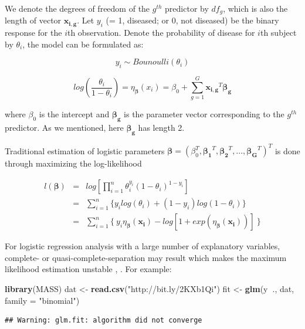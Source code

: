 \documentclass[12pt,]{krantz}
\makeatletter
\newenvironment{Shaded}{\begin{snugshade}}{\end{snugshade}}
\newcommand{\DataTypeTok}[1]{\textcolor[rgb]{0.27,0.27,0.27}{#1}}
\newcommand{\KeywordTok}[1]{\textcolor[rgb]{0.27,0.27,0.27}{\textbf{#1}}}
\newcommand{\NormalTok}[1]{#1}
\newcommand{\OperatorTok}[1]{\textcolor[rgb]{0.43,0.43,0.43}{\textbf{#1}}}
\newcommand{\StringTok}[1]{\textcolor[rgb]{0.5,0.5,0.5}{#1}}
\newenvironment{kframe}{%
\medskip{}
\setlength{\fboxsep}{.8em}
 \def\at@end@of@kframe{}%
 \ifinner\ifhmode%
  \def\at@end@of@kframe{\end{minipage}}%
  \begin{minipage}{\columnwidth}%
 \fi\fi%
 \def\FrameCommand##1{\hskip\@totalleftmargin \hskip-\fboxsep
 \colorbox{shadecolor}{##1}\hskip-\fboxsep
     \hskip-\linewidth \hskip-\@totalleftmargin \hskip\columnwidth}%
 \MakeFramed {\advance\hsize-\width
   \@totalleftmargin\z@ \linewidth\hsize
   \@setminipage}}%
 {\par\unskip\endMakeFramed%
 \at@end@of@kframe}
\renewenvironment{Shaded}{\begin{kframe}}{\end{kframe}}
\makeatother
\begin{document}
We denote the degrees of freedom of the \(g^{th}\) predictor by \(df_g\), which is also the length of vector \(\mathbf{x_{i,g}}\). Let \(y_i\) (= 1, diseased; or 0, not diseased) be the binary response for the \(i\)th observation. Denote the probability
of disease for \(i\)th subject by \(\theta_i\), the model can be formulated as:

\[y_{i}\sim Bounoulli(\theta_{i})\]

\[log\left(\frac{\theta_{i}}{1-\theta_{i}}\right)=\eta_{\mathbf{\beta}}(x_{i})=\beta_{0}+\sum_{g=1}^{G}\mathbf{x_{i,g}}^{T}\mathbf{\mathbf{\beta_{g}}}\]

where \(\beta_{0}\) is the intercept and \(\mathbf{\beta_{g}}\) is the parameter vector corresponding to the \(g^{th}\) predictor. As we mentioned, here \(\mathbf{\beta_{g}}\) has length 2.

Traditional estimation of logistic
parameters \(\mathbf{\beta}=(\beta_{0}^{T},\mathbf{\beta_{1}}^{T},\mathbf{\beta_{2}}^{T},...,\mathbf{\beta_{G}}^{T})^{T}\) is done through maximizing the log-likelihood

\begin{eqnarray*}
l(\mathbf{\beta})&=&log[\prod_{i=1}^{n}\theta_{i}^{y_{i}}(1-\theta_{i})^{1-y_{i}}]\\
&=&\sum_{i=1}^{n}\{y_{i}log(\theta_{i})+(1-y_{i})log(1-\theta_{i})\}\\
&=&\sum_{i=1}^{n}\{\ y_{i}\eta_{\mathbf{\beta}}(\mathbf{x_{i}})-log[1+exp(\eta_{\mathbf{\beta}}(\mathbf{x_{i}}))]\ \}
\label{eq:logisticlikelihood}
\end{eqnarray*}

For logistic regression analysis with a large number of explanatory variables, complete- or quasi-complete-separation may result which makes
the maximum likelihood estimation unstable \citep{Wed1976}, \citep{albert1984}. For example:

\begin{Shaded}
\begin{Highlighting}[]
\KeywordTok{library}\NormalTok{(MASS)}
\NormalTok{dat <-}\StringTok{ }\KeywordTok{read.csv}\NormalTok{(}\StringTok{"http://bit.ly/2KXb1Qi"}\NormalTok{)}
\NormalTok{fit <-}\StringTok{ }\KeywordTok{glm}\NormalTok{(y}\OperatorTok{~}\NormalTok{., dat, }\DataTypeTok{family =} \StringTok{"binomial"}\NormalTok{)}
\end{Highlighting}
\end{Shaded}

\begin{verbatim}
## Warning: glm.fit: algorithm did not converge
\end{verbatim}
\end{document}
